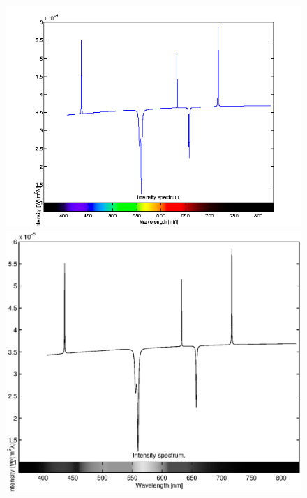 \documentclass[10pt, a4paper]{article}
\begin{document}
\begin{figure}[hbt]
\begin{center}
\ifpdf
	\includegraphics[width=\linewidth]{../img/spectrum_wave.png}
\else
	\includegraphics[width=\linewidth]{../img/spectrum_wave.eps}
\fi
\end{center}
\caption{}
\label{fig:specwave}
\end{figure}
\end{document}
